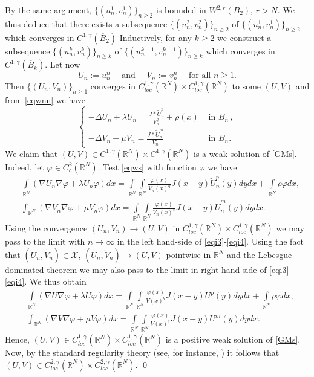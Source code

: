 \documentclass[leqno,12pt]{article}
\newcommand{\vp}{\varphi}
\newcommand{\intl}{\int\limits}
\newcommand{\R}{\mathbb R}
\numberwithin{equation}{section}
\begin{document}
By the same argument, $\{(u_n^1, v_n^1)\}_{n\geq 2}$ is bounded in $W^{2,r}(B_2)$, $r>N$. We thus deduce that there exists a subsequence $\{(u_n^2, v_n^2)\}_{n\geq 2}$  of $\{(u_n^1, v_n^1)\}_{n\geq 2}$  which converges in $C^{1,\gamma}(\overline B_2)$ 
Inductively, for any $k\geq 2$ we construct a subsequence $\{(u_n^k, v_n^k)\}_{n\geq k}$ of $\{(u_n^{k-1}, v_n^{k-1})\}_{n\geq k}$ which converges in $C^{1,\gamma}(\overline B_k)$. 
Let now
$$
U_n:=u_n^n\quad\mbox{ and }\quad  V_n:=v_n^n\quad\mbox{ for all }n\geq 1.
$$
Then $\{(U_n, V_n)\}_{n\geq 1}$ converges in $C^{1,\gamma}_{loc}(\R^N)\times C^{1,\gamma}_{loc}(\R^N)$ to some $(U,V)$ and from \eqref{eqwnn} we have
\begin{equation}\label{eqws}
\begin{cases}
\displaystyle   -\Delta U_n+\lambda U_n=\frac{J * \tilde U_n^p}{V_n^q}+\rho(x) &\mbox{ in }B_n\, ,\\[0.1in]
\displaystyle   -\Delta V_n+\mu V_n=\frac{J * \tilde U_n^m}{V_n^s} &\mbox{ in }B_n. 
\end{cases}
\end{equation}
We claim that $(U, V)\in C^{1,\gamma}(\R^N)\times C^{1,\gamma}(\R^N)$ is a weak solution of \eqref{GMs}. 
Indeed, let $\varphi \in C^2_c(\R^N)$. Test \eqref{eqws} with function $\vp$   we have
\begin{subequations}
\begin{align}
& \displaystyle   \intl_{\R^N} (\nabla U_n\nabla \vp+\lambda U_n\vp)dx=\intl_{\R^N}\intl_{\R^N} \frac{\vp(x)}{V_n(x)^q}  J(x-y) \widetilde U_n^p(y) dy dx +\intl_{\R^N}\rho \vp dx, \label{eqi3}\\[0.2in]
& \displaystyle   \int_{\R^N} (\nabla V_n\nabla \vp+\mu V_n\vp)dx=\intl_{\R^N}\intl_{\R^N} \frac{\vp(x)}{V_n(x)^s} J(x-y) \widetilde U_n^m(y) dy dx.\label{eqi4}
\end{align}
\end{subequations}
Using the convergence $(U_n, V_n)\to (U,V)$ in $C^{1,\gamma}_{loc}(\R^N)\times C^{1,\gamma}_{loc}(\R^N)$ we may pass to the limit with $n\to \infty$ in the left hand-side of \eqref{eqi3}-\eqref{eqi4}. 
Using the fact that $(\widetilde U_n, \widetilde V_n)\in \mathscr{X}$, $(\widetilde U_n, \widetilde V_n)\to (U, V)$ pointwise in $\R^N$ and the Lebesgue dominated theorem we may also pass to the limit in right hand-side of \eqref{eqi3}-\eqref{eqi4}. We thus obtain
$$
\begin{aligned}
& \displaystyle   \intl_{\R^N} (\nabla U\nabla \vp+\lambda U\vp)dx=\intl_{\R^N}\intl_{\R^N} \frac{\vp(x)}{V(x)^q}  J(x-y) U ^p(y) dy dx +\intl_{\R^N}\rho \vp dx, \\[0.2in]
& \displaystyle   \int_{\R^N} (\nabla V\nabla \vp+\mu V\vp)dx=\intl_{\R^N}\intl_{\R^N} \frac{\vp(x)}{V(x)^s} J(x-y) U^m(y) dy dx.
\end{aligned}
$$
Hence, $(U, V)\in C^{1,\gamma}_{loc}(\R^N)\times C^{1,\gamma}_{loc}(\R^N)$ is a positive weak solution of \eqref{GMs}. Now, by the standard regularity theory (see, for instance, \cite[Theorem 9.19]{GT2001}) it follows that $(U,V)\in C^{2, \gamma}_{loc}(\R^N)\times C^{2, \gamma}_{loc}(\R^N)$.
\qed
\end{document}
